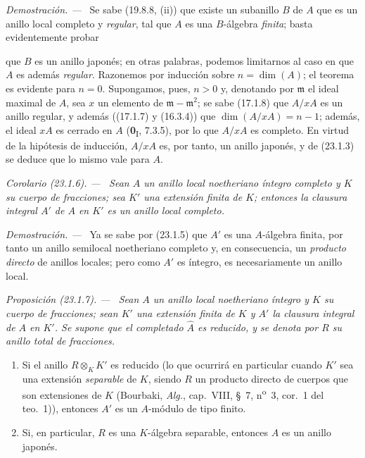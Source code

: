 \documentclass[10pt,oneside]{book}
\makeatletter
\newcommand{\setmanualcurrentlabel}[1]{\def\@currentlabel{#1}}
\newcommand{\oldpage}[2][]{%
  \setcounter{footnote}{0}%
  \marginpar{\scriptsize\textbf{#1}~|~#2}\ignorespaces}
\newenvironment{proposition}[1][]{%
  \setmanualcurrentlabel{#1}\par\medskip\noindent\itshape Proposición (#1). ---\ }{\par}
\newenvironment{corollary}[1][]{%
  \setmanualcurrentlabel{#1}\par\medskip\noindent\itshape Corolario (#1). ---\ }{\par}
\newenvironment{proof}{%
  \par\medskip\noindent\textit{Demostración. ---\ }}{\par}
\providecommand{\setmin}{-}%
\makeatother
\begin{document}
\begin{proof}
Se sabe (19.8.8, (ii)) que existe un subanillo $B$ de $A$ que es un
anillo local completo y \emph{regular}, tal que $A$ es una $B$-álgebra \emph{finita}; basta
evidentemente probar

\oldpage[0\textsubscript{IV-1}]{216}

que $B$ es un anillo japonés; en otras palabras, podemos limitarnos al caso en que
$A$ es además \emph{regular}. Razonemos por inducción sobre
$n=\dim(A)$; el teorema es evidente para $n=0$. Supongamos, pues, $n>0$ y,
denotando por $\mathfrak m$ el ideal maximal de $A$, sea $x$ un elemento de
$\mathfrak m\setmin\mathfrak m^2$; se sabe (17.1.8) que $A/xA$ es un anillo
regular, y además ((17.1.7) y (16.3.4)) que
$\dim(A/xA)=n-1$; además, el ideal $xA$ es cerrado en $A$
(\textbf{0}\textsubscript{I}, 7.3.5), por lo que $A/xA$ es completo. En virtud de la hipótesis
de inducción, $A/xA$ es, por tanto, un anillo japonés, y de
(23.1.3) se deduce que lo mismo vale para $A$.
\end{proof}

\begin{corollary}[23.1.6]
\label{0.23.1.6-es}
Sean $A$ un anillo local noetheriano íntegro completo y $K$ su cuerpo de
fracciones; sea $K'$ una extensión finita de $K$; entonces la clausura integral
$A'$ de $A$ en $K'$ es un anillo local completo.
\end{corollary}

\begin{proof}
Ya se sabe por (23.1.5) que $A'$ es una $A$-álgebra finita, por tanto un anillo
semilocal noetheriano completo y, en consecuencia, un \emph{producto directo}
de anillos locales; pero como $A'$ es íntegro, es necesariamente un
anillo local.
\end{proof}

\begin{proposition}[23.1.7]
\label{0.23.1.7-es}
Sean $A$ un anillo local noetheriano íntegro y $K$ su cuerpo de fracciones;
sean $K'$ una extensión finita de $K$ y $A'$ la clausura integral de $A$ en
$K'$. Se supone que el completado $\widehat A$ es \textup{reducido}, y se denota por
$R$ su anillo total de fracciones.
\begin{enumerate}
  \item[\textup{(i)}] Si el anillo $R\otimes_KK'$ es reducido \textup{(lo que ocurrirá en
  particular cuando $K'$ sea una extensión \emph{separable} de $K$, siendo $R$ un
  producto directo de cuerpos que son extensiones de $K$ (Bourbaki, \emph{Alg.},
  cap.~VIII, §~7, n\textsuperscript{o}~3, cor.~1 del teo.~1))}, entonces $A'$ es
  un $A$-módulo de tipo finito.
  \item[\textup{(ii)}] Si, en particular, $R$ es una $K$-álgebra separable, entonces $A$
  es un anillo japonés.
\end{enumerate}
\end{proposition}
\end{document}
